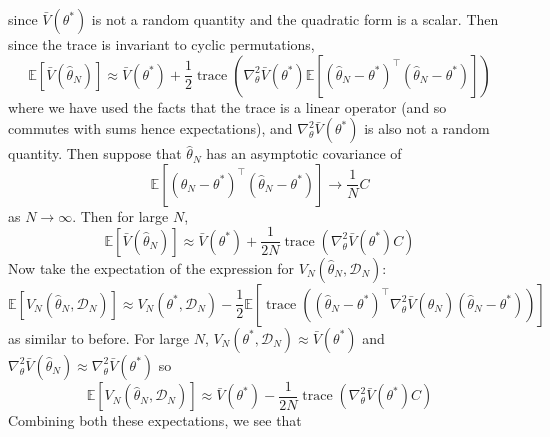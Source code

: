 \documentclass[11pt]{report} %
\begin{document}
since $\bar{V}\left(\theta^{*}\right)$ is not a random quantity and the quadratic form is a scalar. Then since the trace is invariant to cyclic permutations,
\begin{equation}
\mathbb{E}\left[\bar{V}\left(\hat{\theta}_{N}\right)\right] \approx \bar{V}\left(\theta^{*}\right) + \dfrac{1}{2}\operatorname{trace}\left(\nabla_{\theta}^{2}\bar{V}\left(\theta^{*}\right)\mathbb{E}\left[\left(\hat{\theta}_{N} - \theta^{*}\right)^{\top}\left(\hat{\theta}_{N} - \theta^{*}\right)\right]\right)
\end{equation}
where we have used the facts that the trace is a linear operator (and so commutes with sums hence expectations), and $\nabla_{\theta}^{2}\bar{V}\left(\theta^{*}\right)$ is also not a random quantity. Then suppose that $\hat{\theta}_{N}$ has an asymptotic covariance of
\begin{equation}
\mathbb{E}\left[\left(\hat{\theta}_{N} - \theta^{*}\right)^{\top}\left(\hat{\theta}_{N} - \theta^{*}\right)\right] \to \dfrac{1}{N}C
\end{equation}
as $N\to\infty$. Then for large $N$,
\begin{equation}
\mathbb{E}\left[\bar{V}\left(\hat{\theta}_{N}\right)\right] \approx \bar{V}\left(\theta^{*}\right) + \dfrac{1}{2N}\operatorname{trace}\left(\nabla_{\theta}^{2}\bar{V}\left(\theta^{*}\right)C\right)
\end{equation}
Now take the expectation of the expression for $V_{N}\left(\hat{\theta}_{N}, \mathcal{D}_{N}\right)$:
\begin{equation}
\mathbb{E}\left[V_{N}\left(\hat{\theta}_{N}, \mathcal{D}_{N}\right)\right] \approx V_{N}\left(\theta^{*}, \mathcal{D}_{N}\right) - \dfrac{1}{2}\mathbb{E}\left[\operatorname{trace}\left(\left(\hat{\theta}_{N} - \theta^{*}\right)^{\top}\nabla_{\theta}^{2}\bar{V}\left(\hat{\theta}_{N}\right)\left(\hat{\theta}_{N} - \theta^{*}\right)\right)\right]
\end{equation}
as similar to before. For large $N$, $V_{N}\left(\theta^{*}, \mathcal{D}_{N}\right)\approx \bar{V}\left(\theta^{*}\right)$ and $\nabla_{\theta}^{2}\bar{V}\left(\hat{\theta}_{N}\right) \approx \nabla_{\theta}^{2}\bar{V}\left(\theta^{*}\right)$ so
\begin{equation}
\mathbb{E}\left[V_{N}\left(\hat{\theta}_{N}, \mathcal{D}_{N}\right)\right] \approx \bar{V}\left(\theta^{*}\right) - \dfrac{1}{2N}\operatorname{trace}\left(\nabla_{\theta}^{2}\bar{V}\left(\theta^{*}\right)C\right)
\end{equation}
Combining both these expectations, we see that
\end{document}
